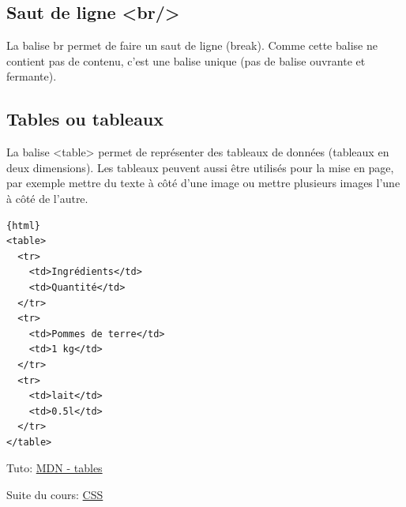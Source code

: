 \documentclass[a4paper,11pt]{article}
\begin{document}
\subsection{Saut de ligne <br/>}
La balise br permet de faire un saut de ligne (break). Comme cette balise ne contient pas de contenu, c'est une balise unique (pas de balise ouvrante et fermante).

\subsection{Tables ou tableaux}
La balise <table> permet de représenter des tableaux de données (tableaux en deux dimensions). Les tableaux peuvent aussi être utilisés pour la mise en page, par exemple mettre du texte à côté d'une image ou mettre plusieurs images l'une à côté de l'autre.
\begin{verbatim}{html}
<table>
  <tr>
    <td>Ingrédients</td>
    <td>Quantité</td>
  </tr>
  <tr>
    <td>Pommes de terre</td>
    <td>1 kg</td>
  </tr>
  <tr>
    <td>lait</td>
    <td>0.5l</td>
  </tr>
</table>
\end{verbatim}
Tuto: \href{https://developer.mozilla.org/fr/docs/Web/HTML/Element/table}{MDN - tables}\par

Suite du cours: \href{http://127.0.0.1:8000/doc/Informatique/HTML}{CSS}
\end{document}
